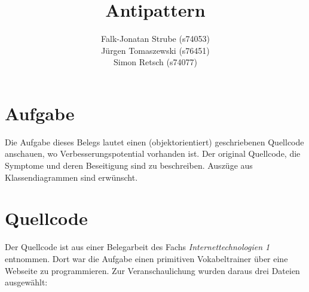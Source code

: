 \documentclass{scrartcl}
\title{Antipattern}
\author{Falk-Jonatan Strube (s74053)\texorpdfstring{\\}{, }
Jürgen Tomaszewski (s76451)\texorpdfstring{\\}{, }
Simon Retsch (s74077)}
\begin{document}
\maketitle
\ofoot{}
\tableofcontents

\section{Aufgabe}
Die Aufgabe dieses Belegs lautet einen (objektorientiert) geschriebenen Quellcode anschauen, wo Verbesserungspotential vorhanden ist. Der original Quellcode, die Symptome und deren Beseitigung sind zu beschreiben. Auszüge aus Klassendiagrammen sind erwünscht.

\section{Quellcode}
\label{quellcode}
Der Quellcode ist aus einer Belegarbeit des Fachs \emph{Internettechnologien 1} entnommen. Dort war die Aufgabe einen primitiven Vokabeltrainer über eine Webseite zu programmieren. 
Zur Veranschaulichung wurden daraus drei Dateien ausgewählt:
\end{document}
